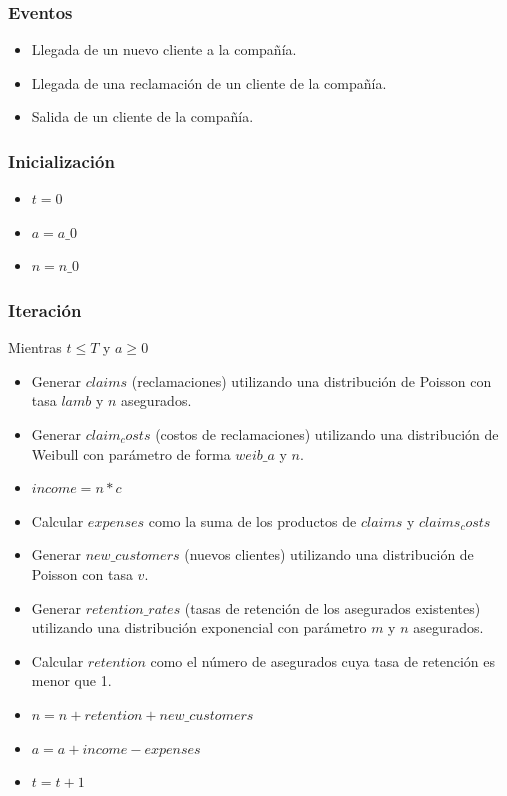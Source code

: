 \documentclass{article}
\begin{document}
\subsubsection{Eventos}
\begin{itemize}
    \item Llegada de un nuevo cliente a la compañía.
    \item Llegada de una reclamación de un cliente de la compañía.
    \item Salida de un cliente de la compañía.
\end{itemize}

\subsubsection{Inicialización}
\begin{itemize}
    \item $t = 0$
    \item $a = a\_0$
    \item $n = n\_0$
\end{itemize}

\subsubsection{Iteración}
Mientras $t \leq T$ y $a \geq 0$
\begin{itemize}
    \item  Generar $claims$ (reclamaciones) utilizando una distribución de Poisson con tasa $lamb$ y $n$ asegurados.
    \item Generar $claim_costs$ (costos de reclamaciones) utilizando una distribución de Weibull con parámetro de forma $weib\_a$ y $n$.
    \item $income = n * c$
    \item Calcular $expenses$ como la suma de los productos de $claims$ y $claims_costs$
    \item  Generar $new\_customers$ (nuevos clientes) utilizando una distribución de Poisson con tasa $v$.
    \item Generar $retention\_rates$ (tasas de retención de los asegurados existentes) utilizando una distribución exponencial con parámetro $m$ y $n$ asegurados.
    \item Calcular $retention$ como el número de asegurados cuya tasa de retención es menor que 1.
    \item $n = n + retention + new\_customers$
    \item $a = a + income - expenses$
    \item $t = t + 1$
\end{itemize}
\end{document}
